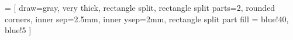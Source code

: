 
\newcommand{\dom}[1]{\text{dom}(#1)}

\newcommand{\comp}[4]{\ensuremath{#1(#3_1(\xDots{x}{n}),\dots,#3_#2(\xDots{x}{n}))}}
	
	
\newcommand{\resta}{\dot{-}}
\newcommand{\imagen}[4]{
\begin{figure}[ht]
	\centering
	\texttt{[image: \#2]}
	\caption{#3}
	\label{#4}
\end{figure}
}

 = [
draw=gray, very thick,
rectangle split, rectangle split parts=2, rounded corners, inner sep=2.5mm, inner ysep=2mm,
rectangle split part fill = {blue!40, blue!5}
]

